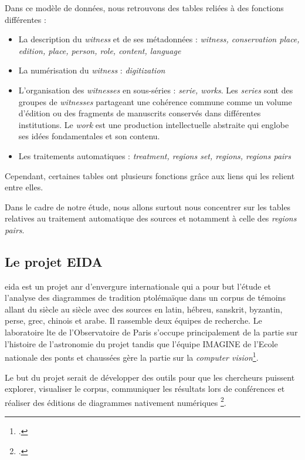 Dans ce modèle de données, nous retrouvons des tables reliées à des fonctions différentes : 
\begin{itemize}
	\item La description du \textit{witness} et de ses métadonnées : \textit{witness, conservation place, edition, place, person, role, content, language}
	\item La numérisation du \textit{witness} : \textit{digitization}
	\item L'organisation des \textit{witnesses} en sous-séries : \textit{serie, works}. Les \textit{series} sont des groupes de \textit{witnesses} partageant une cohérence commune comme un volume d'édition ou des fragments de manuscrits conservés dans différentes institutions. Le \textit{work} est une production intellectuelle abstraite qui englobe ses idées fondamentales et son contenu. 
	\item Les traitements automatiques : \textit{treatment, regions set, regions, regions pairs} 
\end{itemize}

Cependant, certaines tables ont plusieurs fonctions grâce aux liens qui les relient entre elles. 

Dans le cadre de notre étude, nous allons surtout nous concentrer sur les tables relatives au traitement automatique des sources et notamment à celle des \textit{regions pairs}.

\subsection{Le projet EIDA}

\gls{eida} est un projet \gls{anr} d'envergure internationale qui a pour but l'étude et l'analyse des diagrammes de tradition ptolémaïque dans un corpus de témoins allant du \IX siècle au \XIX siècle avec des sources en latin, hébreu, sanskrit, byzantin, perse, grec, chinois et arabe. Il rassemble deux équipes de recherche. Le laboratoire \gls{lte} de l'Observatoire de Paris s'occupe principalement de la partie sur l'histoire de l'astronomie du projet tandis que l'équipe IMAGINE de l'Ecole nationale des ponts et chaussées gère la partie sur la \textit{computer vision}\footcite{albouyAIKONComputerVision}. 

Le but du projet serait de développer des outils pour que les chercheurs puissent explorer, visualiser le corpus, communiquer les résultats lors de conférences et réaliser des éditions de diagrammes nativement numériques \footcite{Conference2023EIDA2023}.

